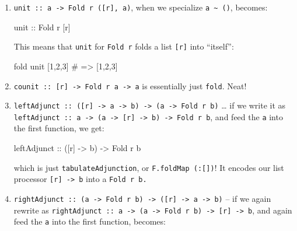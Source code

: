 \documentclass[]{article}
\newenvironment{Shaded}{}{}
\newcommand{\DataTypeTok}[1]{\textcolor[rgb]{0.56,0.13,0.00}{#1}}
\newcommand{\DecValTok}[1]{\textcolor[rgb]{0.25,0.63,0.44}{#1}}
\newcommand{\NormalTok}[1]{#1}
\newcommand{\OtherTok}[1]{\textcolor[rgb]{0.00,0.44,0.13}{#1}}
\newcommand{\PreprocessorTok}[1]{\textcolor[rgb]{0.74,0.48,0.00}{#1}}
\begin{document}
\begin{enumerate}
\def\labelenumi{\arabic{enumi}.}
\item
  \texttt{unit\ ::\ a\ -\textgreater{}\ Fold\ r\ ({[}r{]},\ a)}, when we
  specialize \texttt{a\ \textasciitilde{}\ ()}, becomes:

\begin{Shaded}
\begin{Highlighting}[]
\OtherTok{unit ::} \DataTypeTok{Fold}\NormalTok{ r [r]}
\end{Highlighting}
\end{Shaded}

  This means that \texttt{unit} for \texttt{Fold\ r} folds a list
  \texttt{{[}r{]}} into ``itself'':

\begin{Shaded}
\begin{Highlighting}[]
\NormalTok{fold unit [}\DecValTok{1}\NormalTok{,}\DecValTok{2}\NormalTok{,}\DecValTok{3}\NormalTok{]}
\PreprocessorTok{\#   => [1,2,3]}
\end{Highlighting}
\end{Shaded}
\item
  \texttt{counit\ ::\ {[}r{]}\ -\textgreater{}\ Fold\ r\ a\ -\textgreater{}\ a}
  is essentially just \texttt{fold}. Neat!
\item
  \texttt{leftAdjunct\ ::\ ({[}r{]}\ -\textgreater{}\ a\ -\textgreater{}\ b)\ -\textgreater{}\ (a\ -\textgreater{}\ Fold\ r\ b)}
  \ldots{} if we write it as
  \texttt{leftAdjunct\ ::\ a\ -\textgreater{}\ (a\ -\textgreater{}\ {[}r{]}\ -\textgreater{}\ b)\ -\textgreater{}\ Fold\ r\ b},
  and feed the \texttt{a} into the first function, we get:

\begin{Shaded}
\begin{Highlighting}[]
\OtherTok{leftAdjunct\textquotesingle{} ::}\NormalTok{ ([r] }\OtherTok{{-}>}\NormalTok{ b) }\OtherTok{{-}>} \DataTypeTok{Fold}\NormalTok{ r b}
\end{Highlighting}
\end{Shaded}

  which is just \texttt{tabulateAdjunction}, or \texttt{F.foldMap\ (:{[}{]})}!
  It encodes our list processor \texttt{{[}r{]}\ -\textgreater{}\ b} into a
  \texttt{Fold\ r\ b.}
\item
  \texttt{rightAdjunct\ ::\ (a\ -\textgreater{}\ Fold\ r\ b)\ -\textgreater{}\ ({[}r{]}\ -\textgreater{}\ a\ -\textgreater{}\ b)}
  -- if we again rewrite as
  \texttt{rightAdjunct\ ::\ a\ -\textgreater{}\ (a\ -\textgreater{}\ Fold\ r\ b)\ -\textgreater{}\ {[}r{]}\ -\textgreater{}\ b},
  and again feed the \texttt{a} into the first function, becomes:


\end{enumerate}
\end{document}

